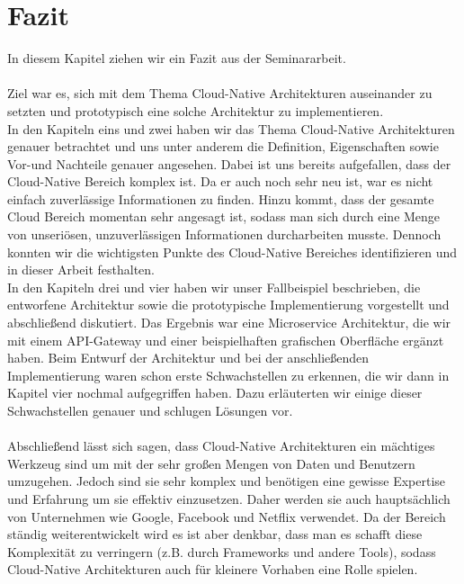 \chapter{Fazit}
In diesem Kapitel ziehen wir ein Fazit aus der Seminararbeit.\\
\\
Ziel war es, sich mit dem Thema Cloud-Native Architekturen auseinander zu setzten und prototypisch eine solche Architektur zu implementieren.\\
In den Kapiteln eins und zwei haben wir das Thema Cloud-Native Architekturen genauer betrachtet und uns unter anderem die Definition, Eigenschaften sowie Vor-und Nachteile genauer angesehen. Dabei ist uns bereits aufgefallen, dass der Cloud-Native Bereich komplex ist. Da er auch noch sehr neu ist, war es nicht einfach zuverlässige Informationen zu finden. Hinzu kommt, dass der gesamte Cloud Bereich momentan sehr angesagt ist, sodass man sich durch eine Menge von unseriösen, unzuverlässigen Informationen durcharbeiten musste. Dennoch konnten wir die wichtigsten Punkte des Cloud-Native Bereiches identifizieren und in dieser Arbeit festhalten.\\
In den Kapiteln drei und vier haben wir unser Fallbeispiel beschrieben, die entworfene Architektur sowie die prototypische Implementierung vorgestellt und abschließend diskutiert. Das Ergebnis war eine Microservice Architektur, die wir mit einem API-Gateway und einer beispielhaften grafischen Oberfläche ergänzt haben. Beim Entwurf der Architektur und bei der anschließenden Implementierung waren schon erste Schwachstellen zu erkennen, die wir dann in Kapitel vier nochmal aufgegriffen haben. Dazu erläuterten wir einige dieser Schwachstellen genauer und schlugen Lösungen vor.\\
\\
Abschließend lässt sich sagen, dass Cloud-Native Architekturen ein mächtiges Werkzeug sind um mit der sehr großen Mengen von Daten und Benutzern umzugehen. Jedoch sind sie sehr komplex und benötigen eine gewisse Expertise und Erfahrung um sie effektiv einzusetzen. Daher werden sie auch hauptsächlich von Unternehmen wie Google, Facebook und Netflix verwendet. Da der Bereich ständig weiterentwickelt wird es ist aber denkbar, dass man es schafft diese Komplexität zu verringern (z.B. durch Frameworks und andere Tools), sodass Cloud-Native Architekturen auch für kleinere Vorhaben eine Rolle spielen.


